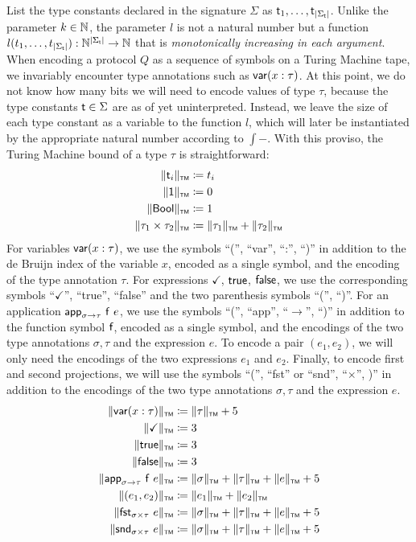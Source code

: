 List the type constants declared in the signature $\Sigma$ as $\mathsf{t}_1,\ldots,\mathsf{t}_{|\Sigma_{\mathsf{t}}|}$. Unlike the parameter $k \in \mathbb{N}$, the parameter $l$ is not a natural number but a function $l(t_1,\ldots,t_{|\Sigma_{\mathsf{t}}|}) : \mathbb{N}^{|\Sigma_{\mathsf{t}}|} \to \mathbb{N}$ that is \emph{monotonically increasing in each argument}. When encoding a protocol $Q$ as a sequence of symbols on a Turing Machine tape, we invariably encounter type annotations such as $\mathsf{var}(x : \tau)$. At this point, we do not know how many bits we will need to encode values of type $\tau$, because the type constants $\mathsf{t} \in \Sigma$ are as of yet uninterpreted. Instead, we leave the size of each type constant as a variable to the function $l$, which will later be instantiated by the appropriate natural number according to $\int{-}$. With this proviso, the Turing Machine bound of a type $\tau$ is straightforward:
\begin{align*}
\Vert \mathsf{t}_i \Vert_{\scriptscriptstyle \mathsf{TM}} & \coloneqq t_i \\
\Vert \mathsf{1} \Vert_{\scriptscriptstyle \mathsf{TM}} & \coloneqq 0 \\
\Vert \mathsf{Bool} \Vert_{\scriptscriptstyle \mathsf{TM}} & \coloneqq 1 \\
\Vert \tau_1 \times \tau_2 \Vert_{\scriptscriptstyle \mathsf{TM}} & \coloneqq \Vert \tau_1 \Vert_{\scriptscriptstyle \mathsf{TM}} + \Vert \tau_2 \Vert_{\scriptscriptstyle \mathsf{TM}}
\end{align*}
For variables $\mathsf{var}(x : \tau)$, we use the symbols \textsf{``(''}, \textsf{``var''}, \textsf{``:''}, \textsf{``)''} in addition to the de Bruijn index of the variable $x$, encoded as a single symbol, and the encoding of the type annotation $\tau$. For expressions $\checkmark$, $\mathsf{true}$, $\mathsf{false}$, we use the corresponding symbols \textsf{``$\checkmark$''}, \textsf{``true''}, \textsf{``false''} and the two parenthesis symbols \textsf{``(''}, \textsf{``)''}. For an application $\mathsf{app}_{\sigma \to \tau} \ \mathsf{f} \ e$, we use the symbols \textsf{``(''}, \textsf{``app''}, \textsf{``$\to$''}, \textsf{``)''} in addition to the function symbol $\mathsf{f}$, encoded as a single symbol, and the encodings of the two type annotations $\sigma, \tau$ and the expression $e$. To encode a pair $(e_1, e_2)$, we will only need the encodings of the two expressions $e_1$ and $e_2$. Finally, to encode first and second projections, we will use the symbols \textsf{``(''}, \textsf{``fst''} or \textsf{``snd''}, \textsf{``$\times$''}, \textsf{)''} in addition to the encodings of the two type annotations $\sigma, \tau$ and the expression $e$.
\begin{align*}
\Vert \mathsf{var}(x : \tau) \Vert_{\scriptscriptstyle \mathsf{TM}} & \coloneqq \Vert \tau \Vert_{\scriptscriptstyle \mathsf{TM}} + 5 \\
\Vert \checkmark \Vert_{\scriptscriptstyle \mathsf{TM}} & \coloneqq 3 \\
\Vert \mathsf{true} \Vert_{\scriptscriptstyle \mathsf{TM}} & \coloneqq 3 \\
\Vert \mathsf{false} \Vert_{\scriptscriptstyle \mathsf{TM}} & \coloneqq 3 \\
\Vert \mathsf{app}_{\sigma \to \tau} \ \mathsf{f} \ e \Vert_{\scriptscriptstyle \mathsf{TM}} & \coloneqq \Vert \sigma \Vert_{\scriptscriptstyle \mathsf{TM}} + \Vert \tau \Vert_{\scriptscriptstyle \mathsf{TM}} + \Vert e \Vert_{\scriptscriptstyle \mathsf{TM}} + 5 \\
\Vert (e_1, e_2) \Vert_{\scriptscriptstyle \mathsf{TM}} & \coloneqq \Vert e_1 \Vert_{\scriptscriptstyle \mathsf{TM}} + \Vert e_2 \Vert_{\scriptscriptstyle \mathsf{TM}} \\
\Vert \mathsf{fst}_{\sigma \times \tau} \ e \Vert_{\scriptscriptstyle \mathsf{TM}} & \coloneqq \Vert \sigma \Vert_{\scriptscriptstyle \mathsf{TM}} + \Vert \tau \Vert_{\scriptscriptstyle \mathsf{TM}} + \Vert e \Vert_{\scriptscriptstyle \mathsf{TM}} + 5 \\
\Vert \mathsf{snd}_{\sigma \times \tau} \ e \Vert_{\scriptscriptstyle \mathsf{TM}} & \coloneqq \Vert \sigma \Vert_{\scriptscriptstyle \mathsf{TM}} + \Vert \tau \Vert_{\scriptscriptstyle \mathsf{TM}} + \Vert e \Vert_{\scriptscriptstyle \mathsf{TM}} + 5
\end{align*}
